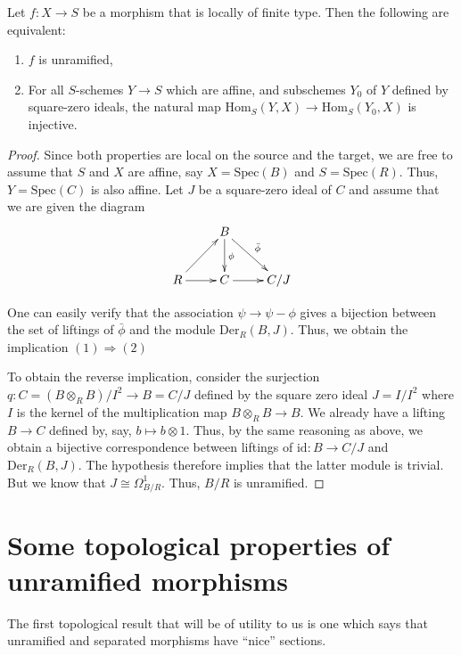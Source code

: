 \begin{theorem}
\label{theorem-formally-unramified}
Let $f:X \to S$ be a morphism that is locally of finite type. Then the
following are equivalent:
\begin{enumerate}
\item $f$ is unramified,
\item For all $S$-schemes $Y \to S$ which are affine, and subschemes $Y_0$ of
$Y$ defined by square-zero ideals, the natural map
$\text{Hom}_S(Y,X) \to \text{Hom}_S(Y_0,X)$ is injective.
\end{enumerate}
\end{theorem}

\begin{proof}
Since both properties are local on the source and the target, we are free to
assume that $S$ and $X$ are affine, say $X = \text{Spec}(B)$ and $S = 
\text{Spec}(R)$.
Thus, $Y = \text{Spec}(C)$ is also affine. Let $J$ be a square-zero ideal of 
$C$ and
assume that we are given the diagram
$$
\xymatrix{
					& B \ar[d]^\phi \ar[rd]^{\bar{\phi}}	
& \\
R \ar[r] \ar[ur]	& C \ar[r]						
		& C/J
}
$$

\medskip\noindent
One can easily verify that the association $\psi \to \psi - \phi$ gives a
bijection between the set of liftings of $\bar{\phi}$ and the module
$\text{Der}_R(B,J)$. Thus, we obtain the implication $(1) \Rightarrow (2)$

\medskip\noindent
To obtain the reverse implication, consider the surjection
$q:C = (B \otimes_R B)/I^2 \to B = C/J$ defined by the square zero ideal
$J = I/I^2$ where $I$ is the kernel of the multiplication map
$B \otimes_R B \to B$. We already have a lifting $B \to C$ defined by, say,
$b \mapsto b \otimes 1$. Thus, by the same reasoning as above, we obtain a
bijective correspondence between liftings of $\mathrm{id}:B \to C/J$ and
$\text{Der}_R(B,J)$. The hypothesis therefore implies that the latter module is
trivial. But we know that $J \cong \Omega^1_{B/R}$. Thus, $B/R$ is unramified.
\end{proof}

\section{Some topological properties of unramified morphisms}
\label{section-topological-unramified}

\noindent
The first topological result that will be of utility to us is one which says
that unramified and separated morphisms have ``nice'' sections.

